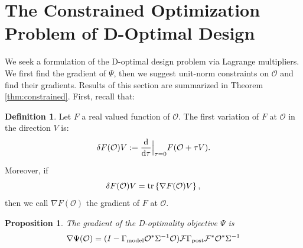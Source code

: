 \documentclass[ba]{imsart}
\newcommand{\der}{\text{\textup{d}}}
\newcommand{\obs}{\mathcal{O}}
\newcommand{\fwd}{\mathcal{F}}
\newcommand{\tar}{\Psi}
\newcommand{\tr}[1]{\textup{tr}\left \{#1 \right \} }
\theoremstyle{plain}
\newtheorem{proposition}[theorem]{Proposition}
\theoremstyle{definition}
\newtheorem{definition}[theorem]{Definition}
\theoremstyle{remark}
\providecommand{\DIFaddbegin}{} %
\providecommand{\DIFaddend}{} %
\providecommand{\DIFdelbegin}{} %
\providecommand{\DIFdelend}{} %
\newcommand{\DIFscaledelfig}{0.5}
\newlength{\DIFdelgraphicswidth} %
\newlength{\DIFdelgraphicsheight} %
\newcommand{\DIFaddincludegraphics}[2][]{{\color{blue}\fbox{\DIFOincludegraphics[#1]{#2}}}} %
\newcommand{\DIFdelincludegraphics}[2][]{%
\sbox{\DIFdelgraphicsbox}{\DIFOincludegraphics[#1]{#2}}%
\settoboxwidth{\DIFdelgraphicswidth}{\DIFdelgraphicsbox} %
\settoboxtotalheight{\DIFdelgraphicsheight}{\DIFdelgraphicsbox} %
\scalebox{\DIFscaledelfig}{%
\parbox[b]{\DIFdelgraphicswidth}{\usebox{\DIFdelgraphicsbox}\\[-\baselineskip] \rule{\DIFdelgraphicswidth}{0em}}\llap{\resizebox{\DIFdelgraphicswidth}{\DIFdelgraphicsheight}{%
\setlength{\unitlength}{\DIFdelgraphicswidth}%
\begin{picture}(1,1)%
\thicklines\linethickness{2pt} %
{\color[rgb]{1,0,0}\put(0,0){\framebox(1,1){}}}%
{\color[rgb]{1,0,0}\put(0,0){\line( 1,1){1}}}%
{\color[rgb]{1,0,0}\put(0,1){\line(1,-1){1}}}%
\end{picture}%
}\hspace*{3pt}}} %
} %
\DeclareRobustCommand{\DIFaddbegin}{\DIFOaddbegin \let\includegraphics\DIFaddincludegraphics} %
\DeclareRobustCommand{\DIFaddend}{\DIFOaddend \let\includegraphics\DIFOincludegraphics} %
\DeclareRobustCommand{\DIFdelbegin}{\DIFOdelbegin \let\includegraphics\DIFdelincludegraphics} %
\DeclareRobustCommand{\DIFdelend}{\DIFOaddend \let\includegraphics\DIFOincludegraphics} %
\begin{document}
\DIFdelend \section{The Constrained Optimization Problem of D-Optimal Design}\label{section:D_and_grad}
We seek a formulation of the D-optimal design problem via Lagrange
multipliers. We first find the gradient of $\tar$, then we suggest
unit-norm constraints on $\obs$ and find their gradients. Results of
this section are summarized in Theorem \ref{thm:constrained}. First,
recall that:
\begin{definition}\label{def:var}
  Let $F$ a real valued function of $\obs$. The first variation of $F$
  at $\obs$ in the direction $V$ is:
  \begin{equation*}
    \delta F(\obs) V := \frac{\der}{\der \tau}\Big |_{\tau=0}  F( \obs + \tau V).
  \end{equation*}

  Moreover, if
  \begin{equation*}
    \delta F(\obs) V = \tr{\nabla F(\obs) V},
  \end{equation*}
  then we call $\nabla F(\obs)$ the gradient of $F$ at $\obs$. 
\end{definition}






\DIFdelbegin %


\DIFdelend \begin{proposition}\label{prop:tar_grad}
  The gradient of the D-optimality objective $\tar$ is
  \DIFdelbegin %
\DIFdelend \DIFaddbegin \begin{equation*}
\nabla \tar(\obs) = ( I - \modcov \obs^* \Sigma^{-1}\obs ) \fwd
    \postcov \fwd^* \obs^* \Sigma^{-1}
  \end{equation*}\DIFaddend 
\end{proposition}
\end{document}

